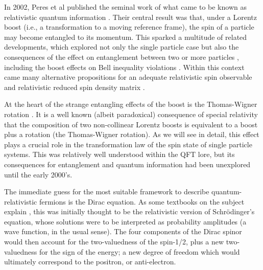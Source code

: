 \documentclass[12pt,a4paper,notitlepage]{report}
\begin{document}
In 2002, Peres et al \cite{peres2002} published the seminal work of what came to be known as relativistic quantum information \cite{peres_2004}. Their central result was that, under a Lorentz boost (i.e., a transformation to a moving reference frame), the spin of a particle may become entangled to its momentum. This sparked a multitude of related developments, which explored not only the single particle case \cite{alsing_milburn_2002, czachor_2005, dunningham_palge_vedral_2009, saldanha_vedral_2012, saldanha_vedral_2013, taillebois_avelar_2013, matsas_2019, bittencourt_2020, bernardini_bittencourt_2020} but also the consequences of the effect on entanglement between two or more particles \cite{gingrich_adami_2002, jordan_2007, chakrabarti_2009, friis_2010, choi_2011, palge_dunningham_2015, palge_2018, bittencourt_2018, fan_li_2018}, including the boost effects on Bell inequality violations \cite{czachor_1997, lee_young_2004, caban_2005, kim_son_2005, brukner_2021}. Within this context came many alternative propositions for an adequate relativistic spin observable \cite{lee_young_2004, grobe_2014, grobe_2014_2, brukner_2019spin} and relativistic reduced spin density matrix \cite{gonera_2004, taillebois_avelar_2013}.

At the heart of the strange entangling effects of the boost is the Thomas-Wigner rotation \cite{thomas_1926, wigner_1939}. It is a well known (albeit paradoxical) consequence of special relativity that the composition of two non-collinear Lorentz boosts is equivalent to a boost plus a rotation (the Thomas-Wigner rotation). As we will see in detail, this effect plays a crucial role in the transformation law of the spin state of single particle systems. This was relatively well understood within the QFT lore, but its consequences for entanglement and quantum information had been unexplored until the early 2000's.

The immediate guess for the most suitable framework to describe quantum-relativistic fermions is the Dirac equation. As some textbooks on the subject explain \cite{sakurai, drell}, this was initially thought to be the relativistic version of Schrödinger's equation, whose solutions were to be interpreted as probability amplitudes (a wave function, in the usual sense). The four components of the Dirac spinor would then account for the two-valuedness of the spin-1/2, plus a new two-valuedness for the sign of the energy; a new degree of freedom which would ultimately correspond to the positron, or anti-electron.
\end{document}
